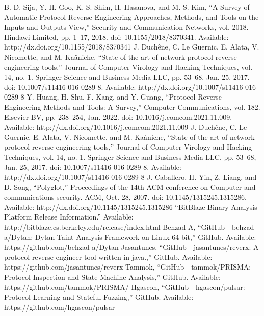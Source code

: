 \documentclass[conference]{IEEEtran}
\begin{document}
\begin{thebibliography}{00}
     B. D. Sija, Y.-H. Goo, K.-S. Shim, H. Hasanova, and M.-S. Kim, “A Survey of Automatic Protocol Reverse Engineering Approaches, Methods, and Tools on the Inputs and Outputs View,” Security and Communication Networks, vol. 2018. Hindawi Limited, pp. 1–17, 2018. doi: 10.1155/2018/8370341. Available: http://dx.doi.org/10.1155/2018/8370341
     J. Duchêne, C. Le Guernic, E. Alata, V. Nicomette, and M. Kaâniche, “State of the art of network protocol reverse engineering tools,” Journal of Computer Virology and Hacking Techniques, vol. 14, no. 1. Springer Science and Business Media LLC, pp. 53–68, Jan. 25, 2017. doi: 10.1007/s11416-016-0289-8. Available: http://dx.doi.org/10.1007/s11416-016-0289-8
     Y. Huang, H. Shu, F. Kang, and Y. Guang, “Protocol Reverse-Engineering Methods and Tools: A Survey,” Computer Communications, vol. 182. Elsevier BV, pp. 238–254, Jan. 2022. doi: 10.1016/j.comcom.2021.11.009. Available: http://dx.doi.org/10.1016/j.comcom.2021.11.009
     J. Duchêne, C. Le Guernic, E. Alata, V. Nicomette, and M. Kaâniche, “State of the art of network protocol reverse engineering tools,” Journal of Computer Virology and Hacking Techniques, vol. 14, no. 1. Springer Science and Business Media LLC, pp. 53–68, Jan. 25, 2017. doi: 10.1007/s11416-016-0289-8. Available: http://dx.doi.org/10.1007/s11416-016-0289-8
     J. Caballero, H. Yin, Z. Liang, and D. Song, “Polyglot,” Proceedings of the 14th ACM conference on Computer and communications security. ACM, Oct. 28, 2007. doi: 10.1145/1315245.1315286. Available: http://dx.doi.org/10.1145/1315245.1315286
     “BitBlaze Binary Analysis Platform Release Information.” Available: http://bitblaze.cs.berkeley.edu/release/index.html
     Behzad-A, “GitHub - behzad-a/Dytan: Dytan Taint Analysis Framework on Linux 64-bit,” GitHub. Available: https://github.com/behzad-a/Dytan
     Jasantunes, “GitHub - jasantunes/reverx: A protocol reverse engineer tool written in java.,” GitHub. Available: https://github.com/jasantunes/reverx
     Tammok, “GitHub - tammok/PRISMA: Protocol Inspection and State Machine Analysis,” GitHub. Available: https://github.com/tammok/PRISMA/
     Hgascon, “GitHub - hgascon/pulsar: Protocol Learning and Stateful Fuzzing,” GitHub. Available: https://github.com/hgascon/pulsar

\end{thebibliography}
\end{document}
